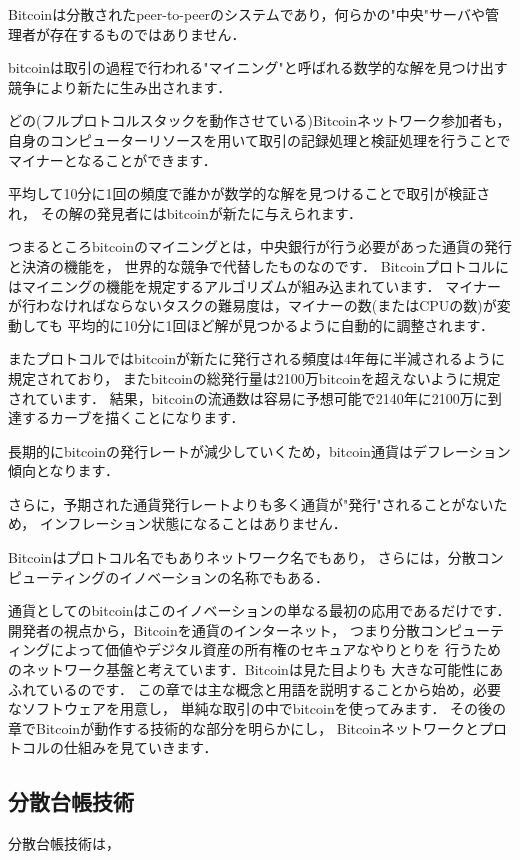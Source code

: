 \documentclass[a4paper,12pt]{jsarticle}
\begin{document}
Bitcoinは分散されたpeer-to-peerのシステムであり，何らかの"中央"サーバや管理者が存在するものではありません．

bitcoinは取引の過程で行われる"マイニング"と呼ばれる数学的な解を見つけ出す競争により新たに生み出されます．

どの(フルプロトコルスタックを動作させている)Bitcoinネットワーク参加者も，
自身のコンピューターリソースを用いて取引の記録処理と検証処理を行うことでマイナーとなることができます．

平均して10分に1回の頻度で誰かが数学的な解を見つけることで取引が検証され，
その解の発見者にはbitcoinが新たに与えられます．

つまるところbitcoinのマイニングとは，中央銀行が行う必要があった通貨の発行と決済の機能を，
世界的な競争で代替したものなのです．
Bitcoinプロトコルにはマイニングの機能を規定するアルゴリズムが組み込まれています．
マイナーが行わなければならないタスクの難易度は，マイナーの数(またはCPUの数)が変動しても
平均的に10分に1回ほど解が見つかるように自動的に調整されます．

またプロトコルではbitcoinが新たに発行される頻度は4年毎に半減されるように規定されており，
またbitcoinの総発行量は2100万bitcoinを超えないように規定されています．
結果，bitcoinの流通数は容易に予想可能で2140年に2100万に到達するカーブを描くことになります．

長期的にbitcoinの発行レートが減少していくため，bitcoin通貨はデフレーション傾向となります．

さらに，予期された通貨発行レートよりも多く通貨が"発行"されることがないため，
インフレーション状態になることはありません．

Bitcoinはプロトコル名でもありネットワーク名でもあり，
さらには，分散コンピューティングのイノベーションの名称でもある．

通貨としてのbitcoinはこのイノベーションの単なる最初の応用であるだけです．
開発者の視点から，Bitcoinを通貨のインターネット，
つまり分散コンピューティングによって価値やデジタル資産の所有権のセキュアなやりとりを
行うためのネットワーク基盤と考えています．Bitcoinは見た目よりも
大きな可能性にあふれているのです．
この章では主な概念と用語を説明することから始め，必要なソフトウェアを用意し，
単純な取引の中でbitcoinを使ってみます．
その後の章でBitcoinが動作する技術的な部分を明らかにし，
Bitcoinネットワークとプロトコルの仕組みを見ていきます．


      \subsection{分散台帳技術}
分散台帳技術は，
\end{document}
